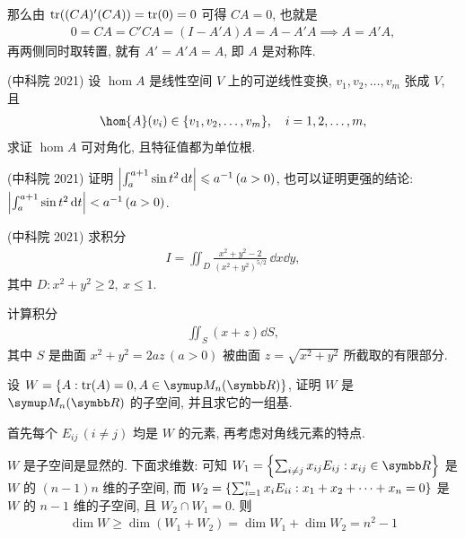 \begin{exercise}[resume=exer]
\begin{answer}
            那么由 $ \tr((CA)'(CA)) = \tr(0) = 0 $ 可得 $ CA = 0 $, 也就是
            \begin{align*}
                0 = CA = C'CA = (I - A'A)A = A - A'A \implies A = A'A,
            \end{align*}
            再两侧同时取转置, 就有 $ A' = A'A = A $, 即 $ A $ 是对称阵.
        \end{answer}
        \item (中科院 2021) 设 $ \hom{A} $ 是线性空间 $ V $ 上的可逆线性变换, $ v_{1}, v_{2}, \dots, v_{m} $ 张成 $ V $, 且
        \begin{align*}
            \hom{A}(v_{i}) \in \set{v_{1}, v_{2}, \dots, v_{m}}, \quad i = 1, 2, \dots, m,
        \end{align*}
        求证 $ \hom{A} $ 可对角化, 且特征值都为单位根. 
        \item (中科院 2021) 证明 $ \abs{\int_{a}^{a + 1} \sin t^{2} \dd{t}} \leqslant a^{-1}\,(a > 0) $, 也可以证明更强的结论: $ \abs{\int_{a}^{a + 1} \sin t^{2} \dd{t}} < a^{-1}\,(a > 0) $. 
        \item (中科院 2021) 求积分 
        \begin{align*}
            I = \iint_{D} \frac{x^{2} + y^{2} - 2}{(x^{2} + y^{2})^{5/2}}\,\dd x\dd y,
        \end{align*}
        其中 $ D: x^{2} + y^{2} \ge 2,\ x \le 1 $.
        \item 计算积分
        \begin{align*}
            \iint_{S} (x + z) \dd{S},
        \end{align*}
        其中 $ S $ 是曲面 $ x^{2} + y^{2} = 2az\,(a > 0) $ 被曲面 $ z = \sqrt{x^{2} + y^{2}} $ 所截取的有限部分.
        \item 设 $ W = \set{A : \tr(A) = 0, A \in \MM} $, 证明 $ W $ 是 $ \MM $ 的子空间, 并且求它的一组基.
        \begin{hint}
            首先每个 $ E_{ij}\,(i \ne j) $ 均是 $ W $ 的元素, 再考虑对角线元素的特点. 
        \end{hint}
        \begin{answer}
            $ W $ 是子空间是显然的. 下面求维数: 可知 $ W_{1} = \set{\sum_{i \ne j} x_{ij}E_{ij} : x_{ij} \in \R} $ 是 $ W $ 的 $ (n - 1)n $ 维的子空间, 而 $ W_{2} = \qty{\sum_{i = 1}^{n} x_{i}E_{ii} : x_{1} + x_{2} + \dots + x_{n} = 0} $ 是 $ W  $ 的 $ n - 1 $ 维的子空间, 且 $ W_{2} \cap W_{1} = 0 $. 则
            \begin{align*}
                \dim W \ge \dim(W_{1} + W_{2}) = \dim W_{1} + \dim W_{2} = n^{2} - 1

\end{align*}
\end{answer}
\end{exercise}
